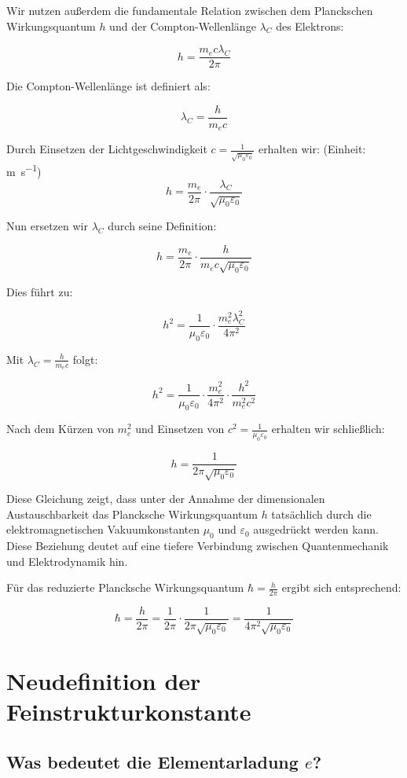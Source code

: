 \documentclass{article}
\begin{document}
	Wir nutzen außerdem die fundamentale Relation zwischen dem Planckschen Wirkungsquantum $h$ und der Compton-Wellenlänge $\lambda_C$ des Elektrons:
	
	$$h = \frac{m_e c \lambda_C}{2\pi}$$
	
	Die Compton-Wellenlänge ist definiert als:
	
	$$\lambda_C = \frac{h}{m_e c}$$
	
	Durch Einsetzen der Lichtgeschwindigkeit $c = \frac{1}{\sqrt{\mu_0\varepsilon_0}}$ erhalten wir:
	(Einheit: \si{\meter\per\second})	
	$$h = \frac{m_e}{2\pi} \cdot \frac{\lambda_C}{\sqrt{\mu_0\varepsilon_0}}$$
	
	Nun ersetzen wir $\lambda_C$ durch seine Definition:
	
	$$h = \frac{m_e}{2\pi} \cdot \frac{h}{m_e c \sqrt{\mu_0\varepsilon_0}}$$
	
	Dies führt zu:
	
	$$h^2 = \frac{1}{\mu_0\varepsilon_0} \cdot \frac{m_e^2 \lambda_C^2}{4\pi^2}$$
	
	Mit $\lambda_C = \frac{h}{m_e c}$ folgt:
	
	$$h^2 = \frac{1}{\mu_0\varepsilon_0} \cdot \frac{m_e^2}{4\pi^2} \cdot \frac{h^2}{m_e^2c^2}$$
	
	Nach dem Kürzen von $m_e^2$ und Einsetzen von $c^2 = \frac{1}{\mu_0\varepsilon_0}$ erhalten wir schließlich:
	
	$$h = \frac{1}{2\pi\sqrt{\mu_0\varepsilon_0}}$$
	
	Diese Gleichung zeigt, dass unter der Annahme der dimensionalen Austauschbarkeit das Plancksche Wirkungsquantum $h$ tatsächlich durch die elektromagnetischen Vakuumkonstanten $\mu_0$ und $\varepsilon_0$ ausgedrückt werden kann. Diese Beziehung deutet auf eine tiefere Verbindung zwischen Quantenmechanik und Elektrodynamik hin.
	
	Für das reduzierte Plancksche Wirkungsquantum $\hbar = \frac{h}{2\pi}$ ergibt sich entsprechend:
	
	$$\hbar = \frac{h}{2\pi} = \frac{1}{2\pi} \cdot \frac{1}{2\pi\sqrt{\mu_0\varepsilon_0}} = \frac{1}{4\pi^2\sqrt{\mu_0\varepsilon_0}}$$
	
	\section{Neudefinition der Feinstrukturkonstante}
	
	\subsection{ Was bedeutet die Elementarladung $e$?}
	
\end{document}
